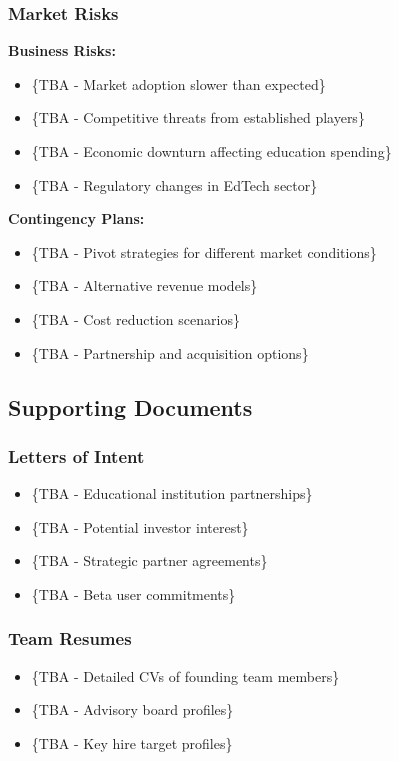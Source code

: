 \subsubsection{Market Risks}
\textbf{Business Risks:}
\begin{itemize}
    \item \{TBA - Market adoption slower than expected\}
    \item \{TBA - Competitive threats from established players\}
    \item \{TBA - Economic downturn affecting education spending\}
    \item \{TBA - Regulatory changes in EdTech sector\}
\end{itemize}

\textbf{Contingency Plans:}
\begin{itemize}
    \item \{TBA - Pivot strategies for different market conditions\}
    \item \{TBA - Alternative revenue models\}
    \item \{TBA - Cost reduction scenarios\}
    \item \{TBA - Partnership and acquisition options\}
\end{itemize}

\subsection{Supporting Documents}
\subsubsection{Letters of Intent}
\begin{itemize}
    \item \{TBA - Educational institution partnerships\}
    \item \{TBA - Potential investor interest\}
    \item \{TBA - Strategic partner agreements\}
    \item \{TBA - Beta user commitments\}
\end{itemize}

\subsubsection{Team Resumes}
\begin{itemize}
    \item \{TBA - Detailed CVs of founding team members\}
    \item \{TBA - Advisory board profiles\}
    \item \{TBA - Key hire target profiles\}
\end{itemize}

